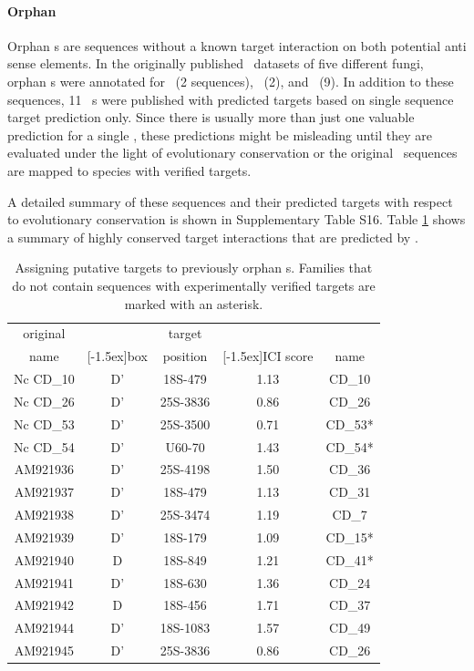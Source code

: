 \paragraph{\textbf{Orphan \sno}}
Orphan \sno s are sequences without a known target interaction on both
potential anti sense elements. In the originally published \sno\
datasets of five different fungi, orphan \cd s were annotated for
\sce\ (2 sequences), \ncr\ (2), and \afu\ (9). In addition to these
sequences, 11 \ncr\ \sno s were published with predicted targets
based on single sequence target prediction only. Since there is
usually more than just one valuable prediction for a single \sno,
these predictions might be misleading until they are evaluated under
the light of evolutionary conservation or the original \sno\ sequences
are mapped to species with verified targets.

A detailed summary of these sequences and their predicted targets with
respect to evolutionary conservation is shown in Supplementary Table
S16. Table \ref{tab:orphan_cd_snoRNAs_short} shows a summary of highly
conserved target interactions that are predicted by \snostrip.

\begin{table}
  \caption{Assigning putative targets to previously
    orphan \cd s. Families that do not contain sequences with
    experimentally verified targets are marked with an asterisk. }
  \label{tab:orphan_cd_snoRNAs_short}
  \begin{center}
    \begin{footnotesize}
      \begin{tabular}{c|c|c|c|c}
      original&&target&&\snostrip\\
      name&\raisebox{1.5ex}[-1.5ex]{box}&position&\raisebox{1.5ex}[-1.5ex]{ICI
      score}&name\\
  \hline
  Nc CD\_10&D'&18S-479&1.13&CD\_10\\
\hline
  Nc CD\_26&D'&25S-3836&0.86&CD\_26\\
\hline
  Nc CD\_53&D'&25S-3500&0.71&CD\_53*\\
\hline
  Nc CD\_54&D'&U60-70&1.43&CD\_54*\\
 \hline
  AM921936&D'&25S-4198&1.50&CD\_36\\
\hline
  AM921937&D'&18S-479&1.13&CD\_31\\
\hline
  AM921938&D'&25S-3474&1.19&CD\_7\\
\hline
  AM921939&D'&18S-179&1.09&CD\_15*\\
\hline
  AM921940&D&18S-849&1.21&CD\_41*\\
\hline
  AM921941&D'&18S-630&1.36&CD\_24\\
\hline
  AM921942&D&18S-456&1.71&CD\_37\\
\hline
  AM921944&D'&18S-1083&1.57&CD\_49\\
\hline
  AM921945&D'&25S-3836&0.86&CD\_26\\

    \end{tabular}
    \end{footnotesize}
  \end{center} 
\end{table}

